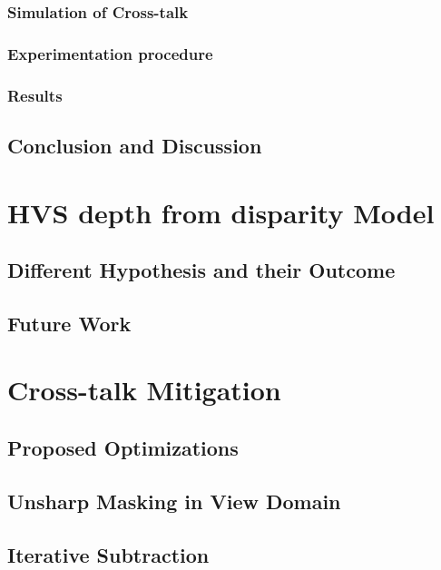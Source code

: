 \subsubsection{Simulation of Cross-talk}
\subsubsection{Experimentation procedure}
\subsubsection{Results}

\subsection{Conclusion and Discussion}

\section{HVS depth from disparity Model}
\subsection{Different Hypothesis and their Outcome}
\subsection{Future Work}


\section{Cross-talk Mitigation}
\subsection{Proposed Optimizations}
\subsection{Unsharp Masking in View Domain}
\subsection{Iterative Subtraction}

